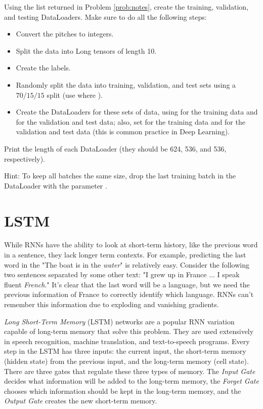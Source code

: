 \begin{problem}
Using the list returned in Problem \ref{prob:notes}, create the training, validation, and testing DataLoaders.
Make sure to do all the following steps:

\begin{itemize}
\item Convert the pitches to integers.
\item Split the data into Long tensors of length 10.
\item Create the labels.
\item Randomly split the data into training, validation, and test sets using a $70/15/15$ split (use  where ).
\item Create the DataLoaders for these sets of data, using  for the training data and  for the validation and test data; also, set  for the training data and  for the validation and test data (this is common practice in Deep Learning).
\end{itemize}

\noindent Print the length of each DataLoader (they should be 624, 536, and 536, respectively).

\noindent Hint: To keep all batches the same size, drop the last training batch in the DataLoader with the parameter .
\label{prob:prob2}
\end{problem}


\section*{LSTM}

While RNNs have the ability to look at short-term history, like the previous word in a sentence, they lack longer term contexts.
For example, predicting the last word in the "The boat is in the \emph{water}" is relatively easy.
Consider the following two sentences separated by some other text: "I grew up in France ... I speak fluent \emph{French}."
It's clear that the last word will be a language, but we need the previous information of France to correctly identify which language.
RNNs can't remember this information due to exploding and vanishing gradients.

\emph{Long Short-Term Memory} (LSTM) networks are a popular RNN variation capable of long-term memory that solve this problem.
They are used extensively in speech recognition, machine translation, and text-to-speech programs.
Every step in the LSTM has three inputs: the current input, the short-term memory (hidden state) from the previous input, and the long-term memory (cell state).
There are three gates that regulate these three types of memory.
The \emph{Input Gate} decides what information will be added to the long-term memory, the \emph{Forget Gate} chooses which information should be kept in the long-term memory, and the \emph{Output Gate} creates the new short-term memory.

